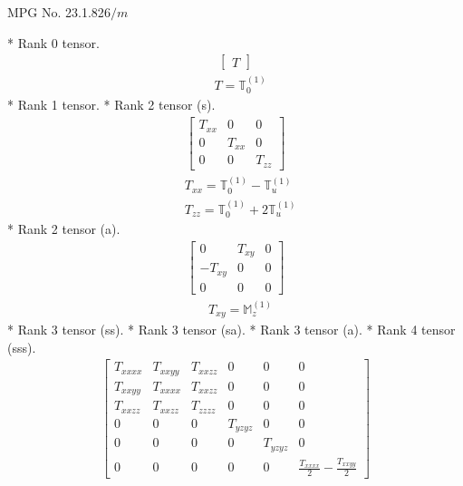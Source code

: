 \documentclass[fleqn,8pt,landscape]{jsarticle}
\begin{document}
\setcounter{MaxMatrixCols}{32}

\renewcommand{\tablename}{Table~}
\renewcommand{\figurename}{Figure~}
\begin{center}
\LARGE
MPG No. 23.1.82\quad$6/m$
\end{center}
* Rank 0 tensor.
\begin{align*}
\begin{bmatrix} T \end{bmatrix}
\end{align*}
\begin{align*}
& T = \mathbb{T}_{0}^{(1)}
\end{align*}
* Rank 1 tensor.
* Rank 2 tensor (s).
\begin{align*}
\begin{bmatrix} T_{xx} & 0 & 0 \\ 0 & T_{xx} & 0 \\ 0 & 0 & T_{zz} \end{bmatrix}
\end{align*}
\begin{align*}
& T_{xx} = \mathbb{T}_{0}^{(1)} - \mathbb{T}_{u}^{(1)} \\
& T_{zz} = \mathbb{T}_{0}^{(1)} + 2 \mathbb{T}_{u}^{(1)}
\end{align*}
* Rank 2 tensor (a).
\begin{align*}
\begin{bmatrix} 0 & T_{xy} & 0 \\ - T_{xy} & 0 & 0 \\ 0 & 0 & 0 \end{bmatrix}
\end{align*}
\begin{align*}
& T_{xy} = \mathbb{M}_{z}^{(1)}
\end{align*}
* Rank 3 tensor (ss).
* Rank 3 tensor (sa).
* Rank 3 tensor (a).
* Rank 4 tensor (sss).
\begin{align*}
\begin{bmatrix} T_{xxxx} & T_{xxyy} & T_{xxzz} & 0 & 0 & 0 \\ T_{xxyy} & T_{xxxx} & T_{xxzz} & 0 & 0 & 0 \\ T_{xxzz} & T_{xxzz} & T_{zzzz} & 0 & 0 & 0 \\ 0 & 0 & 0 & T_{yzyz} & 0 & 0 \\ 0 & 0 & 0 & 0 & T_{yzyz} & 0 \\ 0 & 0 & 0 & 0 & 0 & \frac{T_{xxxx}}{2} - \frac{T_{xxyy}}{2} \end{bmatrix}
\end{align*}
\end{document}
